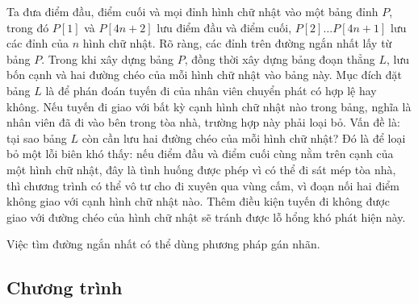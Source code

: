 \documentclass[11pt]{article}
\begin{document}
Ta đưa điểm đầu, điểm cuối và mọi đỉnh hình chữ nhật vào một bảng đỉnh
\(P\), trong đó \(P[1]\) và \(P[4n+2]\) lưu điểm đầu và điểm cuối,
\(P[2]\ldots P[4n+1]\) lưu các đỉnh của \(n\) hình chữ nhật. Rõ ràng, các
đỉnh trên đường ngắn nhất lấy từ bảng \(P\). Trong khi xây dựng bảng \(P\),
đồng thời xây dựng bảng đoạn thẳng \(L\), lưu bốn cạnh và hai đường chéo của
mỗi hình chữ nhật vào bảng này. Mục đích đặt bảng \(L\) là để phán đoán tuyến
đi của nhân viên chuyển phát có hợp lệ hay không. Nếu tuyến đi giao với bất
kỳ cạnh hình chữ nhật nào trong bảng, nghĩa là nhân viên đã đi vào bên trong
tòa nhà, trường hợp này phải loại bỏ. Vấn đề là: tại sao bảng \(L\) còn cần
lưu hai đường chéo của mỗi hình chữ nhật? Đó là để loại bỏ một lỗi biên khó
thấy: nếu điểm đầu và điểm cuối cùng nằm trên cạnh của một hình chữ nhật, đây
là tình huống được phép vì có thể đi sát mép tòa nhà, thì chương trình có thể
vô tư cho đi xuyên qua vùng cấm, vì đoạn nối hai điểm không giao với cạnh
hình chữ nhật nào. Thêm điều kiện tuyến đi không được giao với đường chéo của
hình chữ nhật sẽ tránh được lỗ hổng khó phát hiện này.

Việc tìm đường ngắn nhất có thể dùng phương pháp gán nhãn.

\subsection*{Chương trình}
\end{document}
